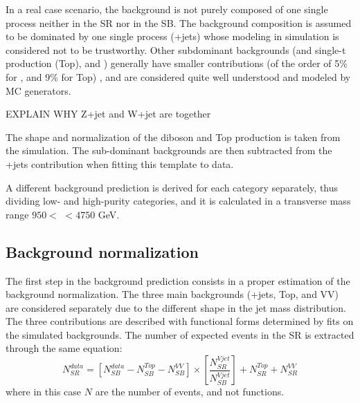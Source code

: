 In a real case scenario, the background is not purely composed of one single process neither in the SR nor in the SB. The background composition is assumed to be dominated by one single process (\V+jets) whose modeling in simulation is considered not to be trustworthy. Other subdominant backgrounds (\ttbar and single-t production (Top), and \V\V) generally have smaller contributions (of the order of 5\% for \V\V, and 9\% for Top) , and are considered quite well understood and modeled by MC generators. 

{\color{red} EXPLAIN WHY Z+jet and W+jet are together}

The shape and normalization of the diboson and Top production is taken from the simulation.
The sub-dominant backgrounds are then subtracted from the \V+jets contribution when fitting this template to data.


A different background prediction is derived for each category separately, thus dividing low- and high-purity categories, and it is calculated in a transverse mass range $950 <$ \mtVZ $<4750$ GeV.

\subsection{Background normalization}\label{ssec:alphaNorm}

The first step in the background prediction consists in a proper estimation of the background normalization. The three main backgrounds (\V+jets, Top, and VV) are considered separately due to the different shape in the jet mass distribution. The three contributions are described with functional forms determined by fits on the simulated backgrounds.
The number of expected events in the SR is extracted through the same equation:
$$N_{SR}^{data} = \left[ N_{SB}^{data} - N_{SB}^{Top} - N_{SB}^{VV} \right] \times \left[ \frac{N_{SR}^{Vjet}}{N_{SB}^{Vjet}} \right]  + N_{SR}^{Top} + N_{SR}^{VV}$$
where in this case $N$ are the number of events, and not functions.

